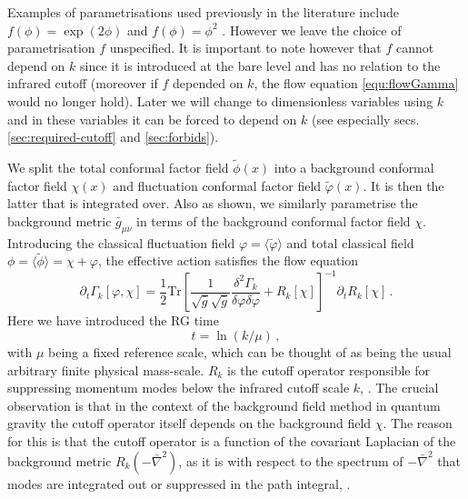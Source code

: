 \documentclass[11pt]{book} %
\newcommand{\be}{\begin{equation}}
\newcommand{\ee}{\end{equation}}
\newcommand{\vp}{\varphi}
\begin{document}
Examples of parametrisations used previously in the literature include  
$f(\phi) = \exp(2\phi)$ \cite{Machado:2009ph} and $f(\phi)=\phi^2$ \cite{Manrique:2009uh,Bonanno:2012dg}. However we leave the choice of parametrisation $f$ unspecified. It is important to note however that $f$ cannot depend on $k$ since it is introduced at the bare level and has no relation to the infrared cutoff (moreover if $f$ depended on $k$, the flow equation \eqref{equ:flowGamma} would no longer hold).  Later we will change to dimensionless variables using $k$ and in these variables it can be forced to depend on $k$   (see especially secs. \ref{sec:required-cutoff} and \ref{sec:forbids}).

We split the total conformal factor field $\tilde\phi(x)$ into a background conformal factor field $\chi(x)$ and fluctuation conformal factor field $\tilde\vp(x)$. It is then the latter that is integrated over. Also as shown, we similarly parametrise the background metric $\bar{g}_{\mu\nu}$ in terms of the background conformal factor field $\chi$. Introducing the classical fluctuation field $\vp = \langle \tilde \vp \rangle$ and total classical field $\phi = \langle \tilde \phi \rangle = \chi + \vp$, the effective action  satisfies the flow equation
\be
\label{equ:flowGamma}
\partial_t \Gamma_k[\vp,\chi] = \frac{1}{2}\mathrm{Tr}\left[\frac{1}{\sqrt{\bar g}\sqrt{\bar g}}\frac{\delta^2\Gamma_k}
				  {\delta \vp \delta \vp}+ R_k[\chi]\right]^{-1} \partial_t R_k[\chi]\,.
\ee
 Here we have introduced the RG time 
\be
\label{time}
t=\ln(k/\mu)\,,
\ee 
with $\mu$ being a fixed reference scale, which can be thought of as being the usual arbitrary finite physical mass-scale. $R_k$ is the cutoff operator responsible for suppressing momentum modes below the infrared cutoff scale $k$, \cf \cite{Wetterich:1992,Morris:1993}. %
%
The crucial observation is that in the context of the background field method in quantum gravity the cutoff operator itself depends on the background field $\chi$. The reason for this is that the cutoff operator is a function of the covariant Laplacian of the background metric $R_k\left(-\bar \nabla^2\right)$, as it is with respect to the spectrum of $-\bar\nabla^2$ that modes are integrated out or suppressed in the path integral, \cf \cite{Reuter:2008wj,Reuter:2009kq}. 
\end{document}
